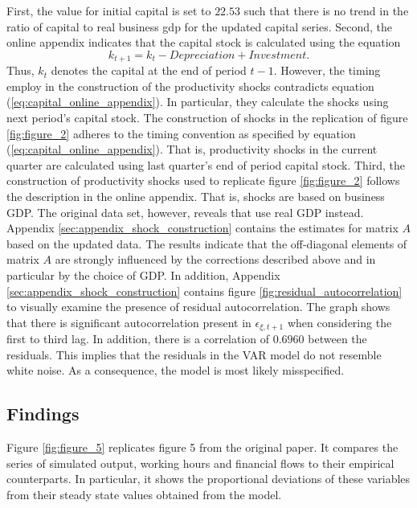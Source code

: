 First, the value for initial capital is set to $22.53$ such that there is no trend in the ratio of capital to real business gdp for the updated capital series. Second, the online appendix indicates that the capital stock is calculated using the equation
\begin{equation} 
	\label{eq:capital_online_appendix}
	k_{t+1} = k_{t} - Depreciation + Investment.
\end{equation} 
Thus, ${k}_t$ denotes the capital at the end of period $t-1$. However, the timing \citeauthor{JERMANNfinancial} employ in the construction of the productivity shocks contradicts equation (\ref{eq:capital_online_appendix}). In particular, they  calculate the shocks using next period's capital stock. The construction of shocks in the replication of figure \ref{fig:figure_2} adheres to the timing convention as specified by equation (\ref{eq:capital_online_appendix}). That is, productivity shocks in the current quarter are calculated using last quarter's end of period capital stock. Third, the construction of productivity shocks used to replicate figure \ref{fig:figure_2} follows the description in the online appendix. That is, shocks are based on business GDP. The original data set, however, reveals that \citeauthor{JERMANNfinancial} use real GDP instead. 
Appendix \ref{sec:appendix_shock_construction} contains the estimates for matrix $A$ based on the updated data. The results indicate that the off-diagonal elements of matrix $A$ are strongly influenced by the corrections described above and in particular by the choice of GDP. In addition, Appendix \ref{sec:appendix_shock_construction} contains figure \ref{fig:residual_autocorrelation} to visually examine the presence of residual autocorrelation. The graph shows that there is significant autocorrelation present in ${\epsilon}_{\xi,t+1}$ when considering the first to third lag. In addition, there is a correlation of $0.6960$ between the residuals. This implies that the residuals in the VAR model do not resemble white noise. As a consequence, the model is most likely misspecified.


\subsection{Findings}
\label{sec:findings}



Figure \ref{fig:figure_5} replicates figure 5 from the original paper. It compares  the series of simulated output, working hours and financial flows to their empirical counterparts. In particular, it shows the proportional deviations of these variables from their steady state values obtained from the model.
